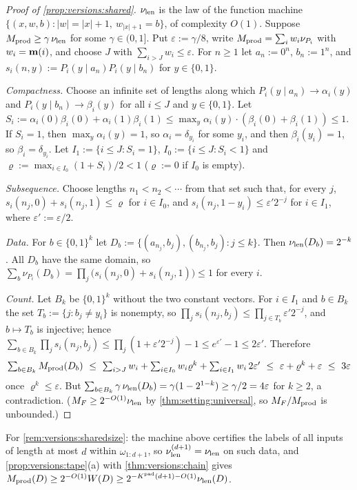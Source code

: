 \begin{proof}[Proof of \cref{prop:versions:shared}]
$\nu_{\mathrm{len}}$ is the law of the function machine $\{(x,w,b):|w|=|x|+1,\ w_{|x|+1}=b\}$, of complexity $O(1)$. Suppose $M_{\mathrm{prod}}\ge\gamma\,\nu_{\mathrm{len}}$ for some $\gamma\in(0,1]$. Put $\varepsilon:=\gamma/8$, write $M_{\mathrm{prod}}=\sum_iw_i\nu_{P_i}$ with $w_i=\mathbf{m}(i)$, and choose $J$ with $\sum_{i>J}w_i\le\varepsilon$. For $n\ge1$ let $a_n:=0^n$, $b_n:=1^n$, and $s_i(n,y):=P_i(y\mid a_n)P_i(y\mid b_n)$ for $y\in\{0,1\}$.

\emph{Compactness.} Choose an infinite set of lengths along which $P_i(y\mid a_n)\to\alpha_i(y)$ and $P_i(y\mid b_n)\to\beta_i(y)$ for all $i\le J$ and $y\in\{0,1\}$. Let $S_i:=\alpha_i(0)\beta_i(0)+\alpha_i(1)\beta_i(1)\le\max_y\alpha_i(y)\cdot(\beta_i(0)+\beta_i(1))\le1$. If $S_i=1$, then $\max_y\alpha_i(y)=1$, so $\alpha_i=\delta_{y_i}$ for some $y_i$, and then $\beta_i(y_i)=1$, so $\beta_i=\delta_{y_i}$. Let $I_1:=\{i\le J:S_i=1\}$, $I_0:=\{i\le J:S_i<1\}$ and $\varrho:=\max_{i\in I_0}(1+S_i)/2<1$ ($\varrho:=0$ if $I_0$ is empty).

\emph{Subsequence.} Choose lengths $n_1<n_2<\cdots$ from that set such that, for every $j$, $s_i(n_j,0)+s_i(n_j,1)\le\varrho$ for $i\in I_0$, and $s_i(n_j,1-y_i)\le\varepsilon'2^{-j}$ for $i\in I_1$, where $\varepsilon':=\varepsilon/2$.

\emph{Data.} For $b\in\{0,1\}^k$ let $D_b:=\{(a_{n_j},b_j),(b_{n_j},b_j):j\le k\}$. Then $\nu_{\mathrm{len}}(D_b)=2^{-k}$. All $D_b$ have the same domain, so $\sum_b\nu_{P_i}(D_b)=\prod_j\big(s_i(n_j,0)+s_i(n_j,1)\big)\le1$ for every $i$.

\emph{Count.} Let $B_k$ be $\{0,1\}^k$ without the two constant vectors. For $i\in I_1$ and $b\in B_k$ the set $T_b:=\{j:b_j\ne y_i\}$ is nonempty, so $\prod_js_i(n_j,b_j)\le\prod_{j\in T_b}\varepsilon'2^{-j}$, and $b\mapsto T_b$ is injective; hence $\sum_{b\in B_k}\prod_js_i(n_j,b_j)\le\prod_j(1+\varepsilon'2^{-j})-1\le e^{\varepsilon'}-1\le2\varepsilon'$. Therefore
\[
\textstyle\sum_{b\in B_k}\Mprod(D_b)\ \le\ \sum_{i>J}w_i+\sum_{i\in I_0}w_i\varrho^k+\sum_{i\in I_1}w_i\,2\varepsilon'\ \le\ \varepsilon+\varrho^k+\varepsilon\ \le\ 3\varepsilon
\]
once $\varrho^k\le\varepsilon$. But $\sum_{b\in B_k}\gamma\,\nu_{\mathrm{len}}(D_b)=\gamma(1-2^{1-k})\ge\gamma/2=4\varepsilon$ for $k\ge2$, a contradiction. ($M_{F}\ge2^{-O(1)}\nu_{\mathrm{len}}$ by \cref{thm:setting:universal}, so $M_{F}/M_{\mathrm{prod}}$ is unbounded.)
\end{proof}

For \cref{rem:versions:sharedsize}: the machine above certifies the labels of all inputs of length at most $d$ within $\omega_{1:d+1}$, so $\nu_{\mathrm{len}}^{(d+1)}=\nu_{\mathrm{len}}$ on such data, and \cref{prop:versions:tape}(a) with \cref{thm:versions:chain} gives $M_{\mathrm{prod}}(D)\ge2^{-O(1)}W(D)\ge2^{-K^{\mathrm{pad}}(d+1)-O(1)}\nu_{\mathrm{len}}(D)$.

